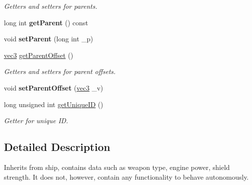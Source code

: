 \begin{DoxyCompactItemize}
\begin{DoxyCompactList}\small\item\em Getters and setters for parents. \end{DoxyCompactList}\item 
\hypertarget{classship_a5a8a7ba1a0fc40f976c1e00e6483efde}{long int {\bfseries get\-Parent} () const }\label{classship_a5a8a7ba1a0fc40f976c1e00e6483efde}

\item 
\hypertarget{classship_a4ce26110be178f9d91b0b063703fbf41}{void {\bfseries set\-Parent} (long int \-\_\-p)}\label{classship_a4ce26110be178f9d91b0b063703fbf41}

\item 
\hypertarget{classship_a26410a4b84949c59af4c942b39a91986}{\hyperlink{structvec3}{vec3} \hyperlink{classship_a26410a4b84949c59af4c942b39a91986}{get\-Parent\-Offset} ()}\label{classship_a26410a4b84949c59af4c942b39a91986}

\begin{DoxyCompactList}\small\item\em Getters and setters for parent offsets. \end{DoxyCompactList}\item 
\hypertarget{classship_abf758a42fb1802a44657a5174800640d}{void {\bfseries set\-Parent\-Offset} (\hyperlink{structvec3}{vec3} \-\_\-v)}\label{classship_abf758a42fb1802a44657a5174800640d}

\item 
\hypertarget{classship_a1b119471128280ae9527949e95fbaca3}{long unsigned int \hyperlink{classship_a1b119471128280ae9527949e95fbaca3}{get\-Unique\-I\-D} ()}\label{classship_a1b119471128280ae9527949e95fbaca3}

\begin{DoxyCompactList}\small\item\em Getter for unique I\-D. \end{DoxyCompactList}\end{DoxyCompactItemize}


\subsection{Detailed Description}
Inherits from ship, contains data such as weapon type, engine power, shield strength. It does not, however, contain any functionality to behave autonomously. 

